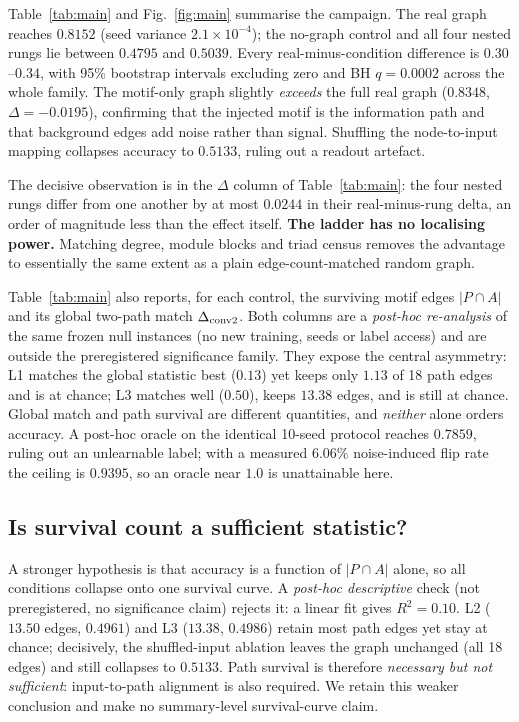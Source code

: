 \documentclass[10pt,twocolumn,letterpaper]{article}
\begin{document}
Table~\ref{tab:main} and Fig.~\ref{fig:main} summarise the campaign. The real
graph reaches $0.8152$ (seed variance $2.1\!\times\!10^{-4}$); the no-graph
control and all four nested rungs lie between $0.4795$ and $0.5039$. Every
real-minus-condition difference is $0.30$--$0.34$, with 95\% bootstrap
intervals excluding zero and BH $q=0.0002$ across the whole family. The
motif-only graph slightly \emph{exceeds} the full real graph
($0.8348$, $\Delta=-0.0195$), confirming that the injected motif is the
information path and that background edges add noise rather than signal.
Shuffling the node-to-input mapping collapses accuracy to $0.5133$, ruling out
a readout artefact.

The decisive observation is in the $\Delta$ column of Table~\ref{tab:main}: the
four nested rungs differ from one another by at most $0.0244$ in their
real-minus-rung delta, an order of magnitude less than the effect itself.
\textbf{The ladder has no localising power.} Matching degree, module blocks and
triad census removes the advantage to essentially the same extent as a plain
edge-count-matched random graph.

Table~\ref{tab:main} also reports, for each control, the surviving motif edges
$|P\cap A|$ and its global two-path match $\Delta_{\rm conv2}$. Both columns are
a \emph{post-hoc re-analysis} of the same frozen null instances (no new
training, seeds or label access) and are outside the preregistered significance
family. They expose the central asymmetry: L1 matches the global statistic best
($0.13$) yet keeps only $1.13$ of 18 path edges and is at chance; L3 matches
well ($0.50$), keeps $13.38$ edges, and is still at chance. Global match and
path survival are different quantities, and \emph{neither} alone orders
accuracy. A post-hoc oracle on the identical 10-seed protocol reaches $0.7859$,
ruling out an unlearnable label; with a measured $6.06\%$ noise-induced flip
rate the ceiling is $0.9395$, so an oracle near $1.0$ is unattainable here.

\subsection{Is survival count a sufficient statistic?}
\label{sec:survival}

A stronger hypothesis is that accuracy is a function of $|P\cap A|$ alone, so
all conditions collapse onto one survival curve. A \emph{post-hoc descriptive}
check (not preregistered, no significance claim) rejects it: a linear fit gives
$R^2=0.10$. L2 ($13.50$ edges, $0.4961$) and L3 ($13.38$, $0.4986$) retain
most path edges yet stay at chance; decisively, the shuffled-input ablation
leaves the graph unchanged (all 18 edges) and still collapses to $0.5133$.
Path survival is therefore \emph{necessary but not sufficient}: input-to-path
alignment is also required. We retain this weaker conclusion and make no
summary-level survival-curve claim.
\end{document}
